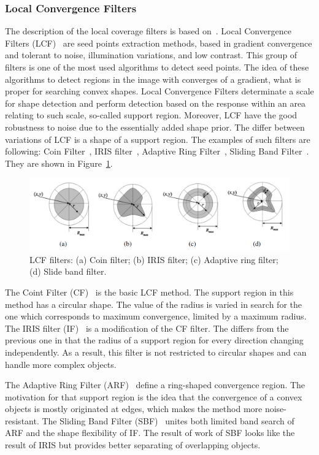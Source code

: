 \documentclass{lutmscthesis}[2010/09/22]
\begin{document}
\subsubsection{Local Convergence Filters}
The description of the local coverage filters is based on~\cite{LCF}.
Local Convergence Filters (LCF)~\cite{LCF} are seed points extraction methods, based
in gradient convergence and tolerant to noise, illumination variations, and low contrast.
This group of filters is one of the most used algorithms to detect seed points.
The idea of these algorithms to detect regions in the image with converges of a gradient, what is proper for searching convex shapes. 
Local Convergence Filters determinate a scale for shape detection and perform
detection based on the response within an area relating to
such scale, so-called support region. Moreover, LCF have the good robustness to noise due to the essentially added shape prior. The differ between variations of LCF is a shape of a support region. The examples of such filters are following: Coin Filter~\cite{LCF_CF}, IRIS filter~\cite{LCF_CF}, Adaptive Ring Filter~\cite{LCF-ARF}, Sliding Band Filter~\cite{LCF-SBF}. They are shown in Figure~\ref{fig:LCF-alg}.

\begin{figure}[ht]
  \includegraphics[width=\linewidth]{LCF.png}
  \caption{LCF filters: (a) Coin filter; (b) IRIS filter; (c) Adaptive ring filter; (d) Slide band filter.~\cite{LCF}}
  \label{fig:LCF-alg}
\end{figure}


The Coint Filter (CF)~\cite{LCF_CF} is the basic LCF method. The support region in this method has a circular shape. The value of the radius is varied in search for the one which
corresponds to maximum convergence, limited by a maximum
radius. 
The IRIS filter (IF)~\cite{LCF_CF} is a modification of the CF filter. The differs from the previous one in that the radius of a support region for every direction changing independently. As a result, this filter is not restricted to circular shapes and can handle more complex objects. 


The Adaptive Ring Filter (ARF)~\cite{LCF-ARF} define a ring-shaped convergence region. The motivation for that support
region is the idea that the convergence of a convex
objects is mostly originated at edges, which makes the method more noise-resistant.
The Sliding Band Filter (SBF)~\cite{LCF-SBF} unites both limited band search of ARF and the shape flexibility of IF. 
The result of work of SBF looks like the result of IRIS but provides better separating of overlapping objects.
\end{document}
